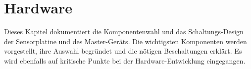 \chapter{Hardware}
\label{chap:hardware}


Dieses  Kapitel dokumentiert  die  Komponentenwahl  und das  Schaltungs-Design
der  Sensorplatine  und  des  Master-Ger\"ats.   Die  wichtigsten  Komponenten
werden vorgestellt,  ihre Auswahl begr\"undet und  die n\"otigen Beschaltungen
erkl\"art. Es wird ebenfalls auf kritische Punkte bei der Hardware-Entwicklung
eingegangen.
